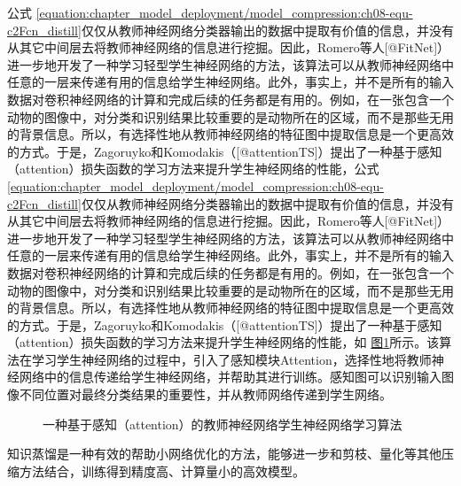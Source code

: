 \documentclass[letterpaper,10pt,english]{sphinxmanual}
\let\sphinxpxdimen\pdfpxdimen\else\newdimen\sphinxpxdimen
\begin{document}
\sphinxAtStartPar
公式
\eqref{equation:chapter_model_deployment/model_compression:ch08-equ-c2Fcn_distill}仅仅从教师神经网络分类器输出的数据中提取有价值的信息，并没有从其它中间层去将教师神经网络的信息进行挖掘。因此，Romero等人{[}@FitNet{]}）进一步地开发了一种学习轻型学生神经网络的方法，该算法可以从教师神经网络中任意的一层来传递有用的信息给学生神经网络。此外，事实上，并不是所有的输入数据对卷积神经网络的计算和完成后续的任务都是有用的。例如，在一张包含一个动物的图像中，对分类和识别结果比较重要的是动物所在的区域，而不是那些无用的背景信息。所以，有选择性地从教师神经网络的特征图中提取信息是一个更高效的方式。于是，Zagoruyko和Komodakis（{[}@attentionTS{]}）提出了一种基于感知（attention）损失函数的学习方法来提升学生神经网络的性能，公式
\eqref{equation:chapter_model_deployment/model_compression:ch08-equ-c2Fcn_distill}仅仅从教师神经网络分类器输出的数据中提取有价值的信息，并没有从其它中间层去将教师神经网络的信息进行挖掘。因此，Romero等人{[}@FitNet{]}）进一步地开发了一种学习轻型学生神经网络的方法，该算法可以从教师神经网络中任意的一层来传递有用的信息给学生神经网络。此外，事实上，并不是所有的输入数据对卷积神经网络的计算和完成后续的任务都是有用的。例如，在一张包含一个动物的图像中，对分类和识别结果比较重要的是动物所在的区域，而不是那些无用的背景信息。所以，有选择性地从教师神经网络的特征图中提取信息是一个更高效的方式。于是，Zagoruyko和Komodakis（{[}@attentionTS{]}）提出了一种基于感知（attention）损失函数的学习方法来提升学生神经网络的性能，如
\hyperref[\detokenize{chapter_model_deployment/model_compression:ch08-fig-distillation}]{图\ref{\detokenize{chapter_model_deployment/model_compression:ch08-fig-distillation}}}所示。该算法在学习学生神经网络的过程中，引入了感知模块Attention，选择性地将教师神经网络中的信息传递给学生神经网络，并帮助其进行训练。感知图可以识别输入图像不同位置对最终分类结果的重要性，并从教师网络传递到学生网络。

\begin{figure}[H]
\centering
\capstart

\noindent\sphinxincludegraphics[width=500\sphinxpxdimen]{{distillation}.png}
\caption{一种基于感知（attention）的教师神经网络\sphinxhyphen{}学生神经网络学习算法}\label{\detokenize{chapter_model_deployment/model_compression:id12}}\label{\detokenize{chapter_model_deployment/model_compression:ch08-fig-distillation}}\end{figure}

\sphinxAtStartPar
知识蒸馏是一种有效的帮助小网络优化的方法，能够进一步和剪枝、量化等其他压缩方法结合，训练得到精度高、计算量小的高效模型。
\end{document}
